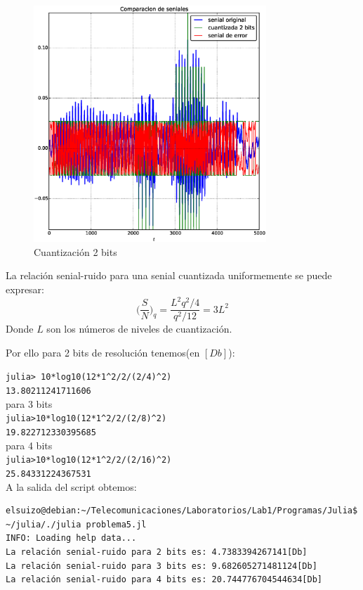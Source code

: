 \documentclass[10pt]{article}
\begin{document}
\begin{figure}[H]
   \centering
   \includegraphics[width=0.78\textwidth]{./Images/senialesv_voz_2_bits.eps}
   \caption{Cuantización 2 bits}\label{fig:qv:2}     
\end{figure}
La relación senial-ruido para una senial cuantizada uniformemente se puede expresar:
\begin{equation}
\Bigg( \frac{S}{N} \Bigg)_{q} = \frac{L^{2}q^{2}/4}{q^{2}/12} = 3L^{2}
\end{equation}
Donde $L$ son los números de niveles de cuantización.

Por ello para 2 bits de resolución tenemos(en $[Db]$):

\verb|julia> 10*log10(12*1^2/2/(2/4)^2)|\\
\verb|13.80211241711606|\\
para 3 bits\\
\verb|julia>10*log10(12*1^2/2/(2/8)^2)|\\
\verb|19.822712330395685|\\
para 4 bits\\
\verb|julia>10*log10(12*1^2/2/(2/16)^2)|\\
\verb|25.84331224367531|\\

A la salida del script obtemos:
\begin{verbatim}
elsuizo@debian:~/Telecomunicaciones/Laboratorios/Lab1/Programas/Julia$ ~/julia/./julia problema5.jl 
INFO: Loading help data...
La relación senial-ruido para 2 bits es: 4.7383394267141[Db]
La relación senial-ruido para 3 bits es: 9.682605271481124[Db]
La relación senial-ruido para 4 bits es: 20.744776704544634[Db]
\end{verbatim}
\end{document}
